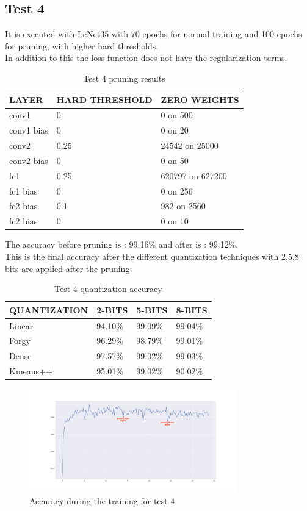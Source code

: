 \documentclass[journal]{vgtc}                %
\begin{document}
\subsection{Test 4}
It is executed with LeNet35 with 70 epochs for normal training and 100 epochs for pruning, with higher hard thresholds.\\In addition to this the loss function does not have the regularization terms.
\begin{table}[H]
\caption{Test 4 pruning results}
\label{my-label}
\begin{tabular}{|l|l|l|}
\hline
LAYER    & HARD THRESHOLD & ZERO WEIGHTS     \\ \hline
conv1      & 0         & 0 on 500 \\ \hline
conv1 bias & 0       & 0 on 20        \\ \hline
conv2      & 0.25         & 24542 on 25000   \\ \hline
conv2 bias & 0      & 0 on 50       \\ \hline
fc1      & 0.25       & 620797 on 627200      \\ \hline
fc1 bias & 0         & 0 on 256          \\ \hline
fc2 bias & 0.1         & 982 on 2560          \\ \hline
fc2 bias & 0         & 0 on 10          \\ \hline

\end{tabular}
\end{table}
The accuracy before pruning is : 99.16\% and after is : 99.12\%.\\This is the final accuracy after the different quantization techniques with 2,5,8 bits are applied after the pruning:
\begin{table}[H]
\caption{Test 4 quantization accuracy}
\label{my-label}
\begin{tabular}{|l|l|l|l|}
\hline
QUANTIZATION & 2-BITS  & 5-BITS  & 8-BITS  \\ \hline
Linear       & 94.10\% & 99.09\% & 99.04\% \\ \hline
Forgy        & 96.29\% & 98.79\% & 99.01\% \\ \hline
Dense        & 97.57\% & 99.02\% & 99.03\% \\ \hline
Kmeans++     & 95.01\% & 99.02\% & 90.02\% \\ \hline
\end{tabular}
\end{table}\begin{figure}[H]
	\hspace*{-1cm}
	\includegraphics[width=90mm,scale=0.7]{accuracy-hard-threshold-conv}
	\caption{Accuracy during the training for test 4}
\end{figure}
\end{document}
